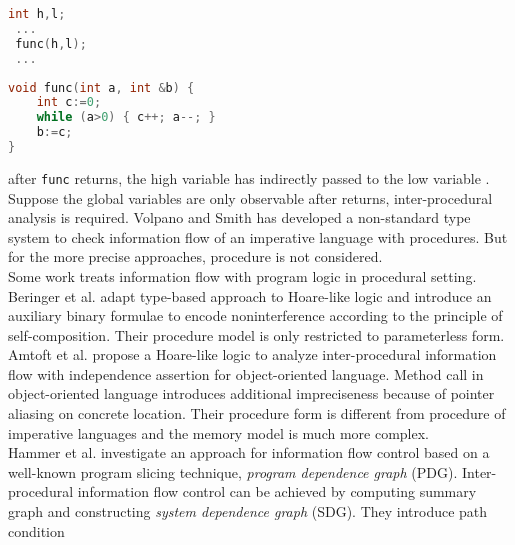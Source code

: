 \documentclass{llncs}
\begin{document}
\begin{minipage}[t]{4.8in}
\hspace*{1cm}
\begin{minipage}[lt]{3cm}
\begin{lstlisting}[language=C,basicstyle=\footnotesize]
 int h,l;
 ...
 func(h,l);
 ...
\end{lstlisting}
\end{minipage}
\begin{minipage}[r]{4.8cm}
\begin{lstlisting}[language=C,basicstyle=\footnotesize]
void func(int a, int &b) {
    int c:=0;
    while (a>0) { c++; a--; }
    b:=c;
}
\end{lstlisting}
\end{minipage}
\end{minipage}
after \texttt{func} returns, the \textsf{high} variable  has
indirectly passed to the \textsf{low} variable . Suppose the
global variables are only observable after  returns,
inter-procedural analysis is required. Volpano and
Smith\cite{DBLP:conf/tapsoft/VolpanoS97} has developed a
non-standard type system to check information flow of an imperative
language with procedures. But for the more precise
approaches\cite{DBLP:conf/pldi/UnnoKY06}\cite{DBLP:conf/sas/TerauchiA05}\cite{DBLP:journals/fuin/FrancescoST03},
procedure is not considered.\\
\indent Some work treats information flow with program logic in
procedural setting. Beringer et al.\cite{DBLP:conf/csfw/BeringerH07}
adapt type-based approach to Hoare-like logic and introduce an
auxiliary binary formulae to encode noninterference according to the
principle of self-composition. Their procedure model is only
restricted to parameterless form. Amtoft et
al.\cite{DBLP:conf/popl/AmtoftBB06} propose a Hoare-like logic to
analyze inter-procedural information flow with independence
assertion for object-oriented language. Method call in
object-oriented language introduces additional impreciseness because
of pointer aliasing on concrete location. Their procedure form is
different from procedure of imperative languages and the memory
model is much more complex.\\
\indent Hammer et al.\cite{Hammer06informationflow} investigate an
approach for information flow control based on a well-known program
slicing technique, \emph{program dependence graph} (PDG).
Inter-procedural information flow control can be achieved by
computing summary graph and constructing \emph{system dependence
graph} (SDG). They introduce path
condition\cite{DBLP:journals/tosem/SneltingRK06}\cite{DBLP:conf/sas/Snelting96}
\end{document}
